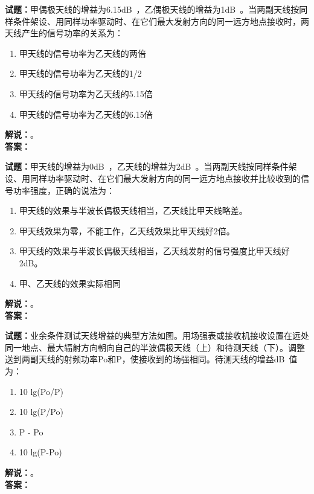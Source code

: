 \documentclass{ctexbook}
\begin{document}
\bigskip

\noindent\textbf{试题：}甲偶极天线的增益为6.15\unit[qualifier-mode=combine]{\deci\bel{}}，乙偶极天线的增益为1\unit[qualifier-mode=combine]{\deci\bel{}}。当两副天线按同样条件架设、用同样功率驱动时、在它们最大发射方向的同一远方地点接收时，两天线产生的信号功率的关系为：
\begin{enumerate}[leftmargin=3em]
  \item 甲天线的信号功率为乙天线的两倍
  \item 甲天线的信号功率为乙天线的1/2
  \item 甲天线的信号功率为乙天线的5.15倍
  \item 甲天线的信号功率为乙天线的6.15倍
\end{enumerate}
\noindent\textbf{解说：}\textbf{}。\\\noindent\textbf{答案：}

\bigskip

\noindent\textbf{试题：}甲天线的增益为0\unit[qualifier-mode=combine]{\deci\bel{}}，乙天线的增益为2\unit[qualifier-mode=combine]{\deci\bel{}}。当两副天线按同样条件架设、用同样功率驱动时、在它们最大发射方向的同一远方地点接收并比较收到的信号功率强度，正确的说法为：
\begin{enumerate}[leftmargin=3em]
  \item 甲天线的效果与半波长偶极天线相当，乙天线比甲天线略差。
  \item 甲天线效果为零，不能工作，乙天线效果比甲天线好2倍。
  \item 甲天线的效果与半波长偶极天线相当，乙天线发射的信号强度比甲天线好2dB。
  \item 甲、乙天线的效果实际相同
\end{enumerate}
\noindent\textbf{解说：}\textbf{}。\\\noindent\textbf{答案：}

\bigskip

\noindent\textbf{试题：}业余条件测试天线增益的典型方法如图。用场强表或接收机接收设置在远处同一地点、最大辐射方向朝向自己的半波偶极天线（上）和待测天线（下）。调整送到两副天线的射频功率Po和P，使接收到的场强相同。待测天线的增益\unit[qualifier-mode=combine]{\deci\bel{}}值为：
\begin{enumerate}[leftmargin=3em]
  \item 10 lg(Po/P)
  \item 10 lg(P/Po)
  \item P - Po
  \item 10 lg(P-Po)
\end{enumerate}
\noindent\textbf{解说：}\textbf{}。\\\noindent\textbf{答案：}
\end{document}
